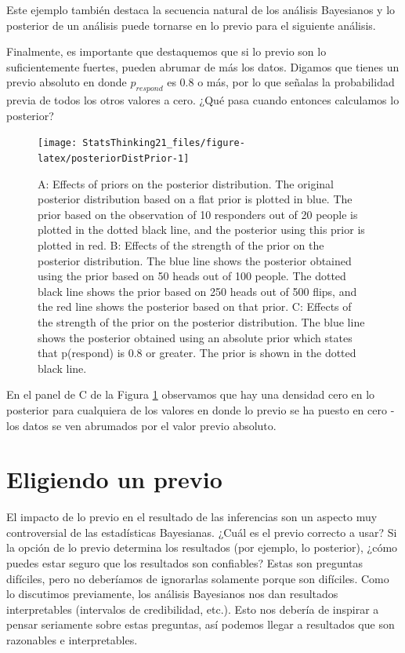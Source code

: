 \documentclass[
  12pt,
]{book}
\theoremstyle{definition}
\theoremstyle{definition}
\theoremstyle{definition}
\theoremstyle{remark}
\begin{document}
Este ejemplo también destaca la secuencia natural de los análisis Bayesianos y lo posterior de un análisis puede tornarse en lo previo para el siguiente análisis.

Finalmente, es importante que destaquemos que si lo previo son lo suficientemente fuertes, pueden abrumar de más los datos. Digamos que tienes un previo absoluto en donde \(p_{respond}\) es 0.8 o más, por lo que señalas la probabilidad previa de todos los otros valores a cero. ¿Qué pasa cuando entonces calculamos lo posterior?

\begin{figure}
\texttt{[image: StatsThinking21\_files/figure-latex/posteriorDistPrior-1]} \caption{A: Effects of priors on the posterior distribution.  The original posterior distribution based on a flat prior is plotted in blue. The prior based on the observation of 10 responders out of 20 people is plotted in the dotted black line, and the posterior using this prior is plotted in red.  B: Effects of the strength of the prior on the posterior distribution. The blue line shows the posterior obtained using the prior based on 50 heads out of 100 people.  The dotted black line shows the prior based on 250 heads out of 500 flips, and the red line shows the posterior based on that prior. C: Effects of the strength of the prior on the posterior distribution. The blue line shows the posterior obtained using an absolute prior which states that p(respond) is 0.8 or greater.  The prior is shown in the dotted black line.}\label{fig:posteriorDistPrior}
\end{figure}

En el panel de C de la Figura \ref{fig:posteriorDistPrior} observamos que hay una densidad cero en lo posterior para cualquiera de los valores en donde lo previo se ha puesto en cero - los datos se ven abrumados por el valor previo absoluto.

\hypertarget{eligiendo-un-previo}{%
\section{Eligiendo un previo}\label{eligiendo-un-previo}}

El impacto de lo previo en el resultado de las inferencias son un aspecto muy controversial de las estadísticas Bayesianas. ¿Cuál es el previo correcto a usar? Si la opción de lo previo determina los resultados (por ejemplo, lo posterior), ¿cómo puedes estar seguro que los resultados son confiables? Estas son preguntas difíciles, pero no deberíamos de ignorarlas solamente porque son difíciles. Como lo discutimos previamente, los análisis Bayesianos nos dan resultados interpretables (intervalos de credibilidad, etc.). Esto nos debería de inspirar a pensar seriamente sobre estas preguntas, así podemos llegar a resultados que son razonables e interpretables.
\end{document}
